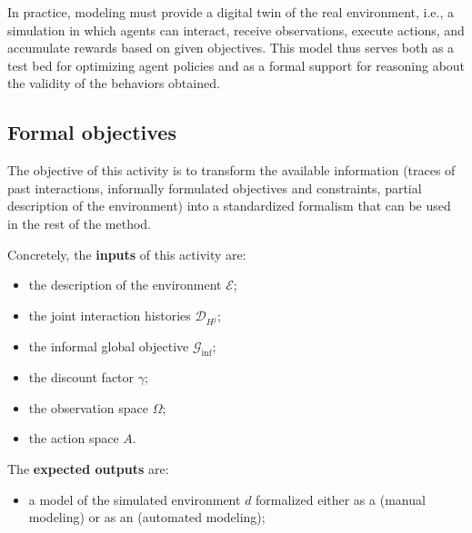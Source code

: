 In practice, modeling must provide a digital twin of the real environment, i.e., a simulation in which agents can interact, receive observations, execute actions, and accumulate rewards based on given objectives.
This model thus serves both as a test bed for optimizing agent policies and as a formal support for reasoning about the validity of the behaviors obtained.

\subsection*{Formal objectives}
The objective of this activity is to transform the available information (traces of past interactions, informally formulated objectives and constraints, partial description of the environment) into a standardized formalism that can be used in the rest of the method.

Concretely, the \textbf{inputs} of this activity are:
\begin{itemize}
  \item the description of the environment $\mathcal{E}$;
  \item the joint interaction histories $\mathcal{D}_{H^j}$;
  \item the informal global objective $\mathcal{G}_{\text{inf}}$;
  \item the discount factor $\gamma$;
  \item the observation space $\Omega$;
  \item the action space $A$.
\end{itemize}

\noindent
The \textbf{expected outputs} are:
\begin{itemize}
  \item a model of the simulated environment $d$ formalized either as a  (manual modeling) or as an  (automated modeling);
\end{itemize}

